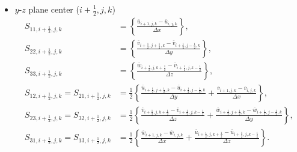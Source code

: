 \begin{itemize}
    \item $y$-$z$ plane center ($i+\frac{1}{2},j,k$)
    \begin{align}
      S_{11,i+\frac{1}{2},j,k} &= \left\{
      \frac{\overline{u}_{i+1,j,k}-\overline{u}_{i,j,k}}{\Delta x}
      \right\}, \\
      S_{22,i+\frac{1}{2},j,k} &= \left\{
      \frac{\overline{v}_{i+\frac{1}{2},j+\frac{1}{2},k}-\overline{v}_{i+\frac{1}{2},j-\frac{1}{2},k}}{\Delta y}
      \right\}, \\
      S_{33,i+\frac{1}{2},j,k} &= \left\{
      \frac{\overline{w}_{i+\frac{1}{2},j,k+\frac{1}{2}}-\overline{v}_{i+\frac{1}{2},j,k-\frac{1}{2}}}{\Delta z}
      \right\}, \\
      S_{12,i+\frac{1}{2},j,k} = S_{21,i+\frac{1}{2},j,k} &= \frac{1}{2}\left\{
      \frac{\overline{u}_{i+\frac{1}{2},j+\frac{1}{2},k}-\overline{u}_{i+\frac{1}{2},j-\frac{1}{2},k}}{\Delta y}
     +\frac{\overline{v}_{i+1,j,k}-\overline{v}_{i,j,k}}{\Delta x}
      \right\}, \\
      S_{23,i+\frac{1}{2},j,k} = S_{32,i+\frac{1}{2},j,k} &= \frac{1}{2}\left\{
      \frac{\overline{v}_{i+\frac{1}{2},j,k+\frac{1}{2}}-\overline{v}_{i+\frac{1}{2},j,k-\frac{1}{2}}}{\Delta z}
     +\frac{\overline{w}_{i+\frac{1}{2},j+\frac{1}{2},k}-\overline{w}_{i+\frac{1}{2},j-\frac{1}{2},k}}{\Delta y}
      \right\}, \\
      S_{31,i+\frac{1}{2},j,k} = S_{13,i+\frac{1}{2},j,k} &= \frac{1}{2}\left\{
      \frac{\overline{w}_{i+1,j,k}-\overline{w}_{i,j,k}}{\Delta x}
     +\frac{\overline{u}_{i+\frac{1}{2},j,k+\frac{1}{2}}-\overline{u}_{i+\frac{1}{2},j,k-\frac{1}{2}}}{\Delta z}
      \right\}.
    \end{align}


\end{itemize}
